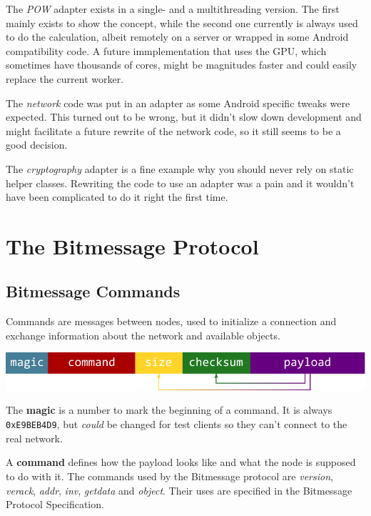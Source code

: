 \documentclass{bfh}
\begin{document}
  The \textit{\acl{POW}} adapter exists in a single- and a multithreading version. The first mainly exists to show the concept, while the second one currently is always used to do the calculation, albeit remotely on a server or wrapped in some Android compatibility code. A future immplementation that uses the \acs{GPU}, which sometimes have thousands of cores, might be magnitudes faster and could easily replace the current worker.

  The \textit{network} code was put in an adapter as some Android specific tweaks were expected. This turned out to be wrong, but it didn't slow down development and might facilitate a future rewrite of the network code, so it still seems to be a good decision.

  The \textit{cryptography} adapter is a fine example why you should never rely on static helper classes. Rewriting the code to use an adapter was a pain and it wouldn't have been complicated to do it right the first time.


  \newpage
  \section{The Bitmessage Protocol}

  \subsection{Bitmessage Commands}

  Commands are messages between nodes, used to initialize a connection and exchange information about the network and available objects.

  \includegraphics[width=\textwidth]{images/command.pdf}

  The \textbf{magic} is a number to mark the beginning of a command. It is always \texttt{0xE9BEB4D9}, but \textit{could} be changed for test clients so they can't connect to the real network.

  A \textbf{command} defines how the payload looks like and what the node is supposed to do with it. The commands used by the Bitmessage protocol are \textit{version}, \textit{verack}, \textit{addr}, \textit{inv}, \textit{getdata} and \textit{object}. Their uses are specified in the Bitmessage Protocol Specification.\cite{wiki:protocol}
\end{document}
